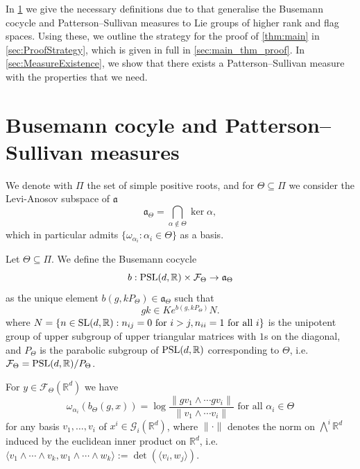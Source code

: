 \documentclass{report}
\begin{document}
In \cref{sec:busemann} we give the necessary definitions due to \cite{quint2002mesures} that generalise the Busemann cocycle and Patterson--Sullivan measures to Lie groups of higher rank and flag spaces.
Using these, we outline the strategy for the proof of \cref{thm:main} in \cref{sec:ProofStrategy}, which is given in full in \cref{sec:main_thm_proof}.
In \cref{sec:MeasureExistence}, we show that there exists a Patterson--Sullivan measure with the properties that we need. 

\section{Busemann cocyle and Patterson--Sullivan measures}\label{sec:busemann}
We denote with $\Pi$ the set of simple positive roots, and for $\Theta \subseteq \Pi$ we consider the Levi-Anosov subspace of $\mathfrak a$
\[
    \mathfrak a_\Theta = \bigcap_{\alpha \notin \Theta} \ker \alpha,
\]
which in particular admits $\{ \omega_{\alpha_i} : \alpha_i \in \Theta \}$ as a basis.
\begin{definition}
    Let $\Theta \subseteq \Pi$. We define the Busemann cocycle
    \[
    b : \operatorname{{\mathrm{PSL}}}(d, \mathbb R) \times \mathcal F_\Theta \to \mathfrak a_\Theta
    \]
    as the unique element $b(g, k P_\Theta) \in \mathfrak a_\Theta$ such that
    \[
    g k \in K e^{b(g, k P_\Theta)} N.
    \]
    where $N = \{ n \in \operatorname{{\mathrm{SL}}}(d, \mathbb R) : n_{ij} = 0 \text{ for } i > j, n_{ii} = 1 \text{ for all } i \}$ is the unipotent group of upper subgroup of upper triangular matrices with $1$s on the diagonal, and $P_\Theta$ is the parabolic subgroup of $\operatorname{{\mathrm{PSL}}}(d, \mathbb R)$ corresponding to $\Theta$, i.e.\ $\mathcal F_\Theta = \operatorname{{\mathrm{PSL}}}(d, \mathbb R)/P_\Theta$.
\end{definition}
\begin{lemma}\label{lem:busemann_weight}
For $y \in \mathcal F_\Theta(\mathbb R^d)$ we have    
\[
    \omega_{\alpha_i}(b_\Theta(g, x)) =
    \log \frac{\| g v_1 \wedge \cdots g v_i \|}{ \| v_1 \wedge \cdots v_i \| }
    \text{ for all } \alpha_i \in \Theta
\]
for any basis $v_1, \ldots, v_i$ of $x^i \in \mathcal G_i(\mathbb R^d)$, where $\| \cdot \|$ denotes the norm on $\bigwedge^i \mathbb R^d$ induced by the euclidean inner product on $\mathbb R^d$, 
i.e.\ $ \langle v_1 \wedge \cdots \wedge v_k, w_1 \wedge \cdots \wedge w_k \rangle := \det(\langle v_i, w_j \rangle)$.
\end{lemma}
\end{document}
